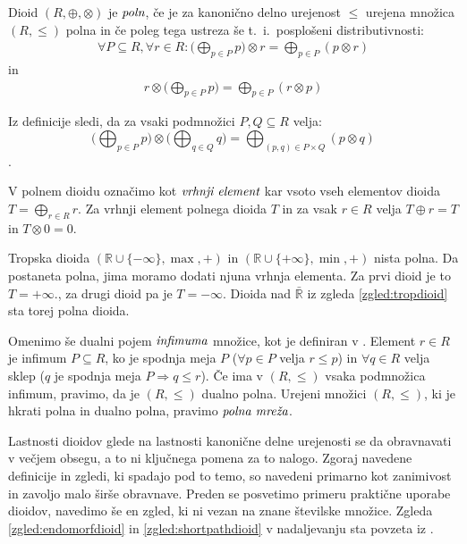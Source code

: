 \documentclass[mat1]{fmfdelo}
\newcommand{\R}{\mathbb{R}}
\newcommand{\pojem}[1]{\ensuremath{\emph{#1}}}
\begin{document}
\begin{definicija}
	Dioid $(R, \oplus,\otimes)$ je \pojem{poln}, če je za kanonično delno urejenost $\leq$ urejena množica $(R, \leq)$ polna in če poleg tega ustreza še t.~i.~posplošeni distributivnosti: \begin{align*}
		\forall P \subseteq R, \forall r \in R: \big(\bigoplus_{p\in P}p\big) \otimes r = \bigoplus_{p\in P} \left(p \otimes r\right)
	\end{align*}
in
\begin{align*}
	r \otimes \big( \bigoplus_{p\in P} p \big) = \bigoplus_{p \in P} \left( r \otimes p \right)
\end{align*}
\end{definicija}

Iz definicije sledi, da za vsaki podmnožici $P, Q \subseteq R$ velja: $$\big( \bigoplus_{p\in P} p \big) \otimes \big( \bigoplus_{q\in Q} q \big) = \bigoplus_{(p, q) \in P\times Q} (p \otimes q)$$.

V polnem dioidu označimo kot \pojem{vrhnji element} kar vsoto vseh elementov dioida $T = \bigoplus_{r \in R} r$. Za vrhnji element polnega dioida $T$ in za vsak $r\in R$ velja $T \oplus r = T$ in $T \otimes 0 = 0$.

\begin{zgled}
	Tropska dioida $(\R\cup \{-\infty\}, \max, +)$ in $(\R\cup \{+\infty\}, \min, +)$ nista polna. Da postaneta polna, jima moramo dodati njuna vrhnja elementa. Za prvi dioid je to $T = +\infty$., za drugi dioid pa je $T = -\infty$. Dioida nad $\bar{\R}$ iz zgleda \ref{zgled:tropdioid} sta torej polna dioida.
\end{zgled}

\begin{opomba}
	Omenimo še dualni pojem \pojem{infimuma} množice, kot je definiran v \cite[str. 10]{bib:Gondran}.
	Element $r\in R$ je infimum $P\subseteq R$, ko je spodnja meja $P$ ($\forall p \in P$ velja $ r \leq p$) in $\forall q \in R$ velja sklep ($q$ je spodnja meja $P \Rightarrow q \leq r$). Če ima v $(R, \leq)$ vsaka podmnožica infimum, pravimo, da je $(R, \leq)$ dualno polna. Urejeni množici $(R, \leq)$, ki je hkrati polna in dualno polna, pravimo \pojem{polna mreža}.
\end{opomba}

Lastnosti dioidov glede na lastnosti kanonične delne urejenosti se da obravnavati v večjem obsegu, a to ni ključnega pomena za to nalogo. Zgoraj navedene definicije in zgledi, ki spadajo pod to temo, so navedeni primarno kot zanimivost in zavoljo malo širše obravnave. Preden se posvetimo primeru praktične uporabe dioidov, navedimo še en zgled, ki ni vezan na znane številske množice. Zgleda \ref{zgled:endomorfdioid} in \ref{zgled:shortpathdioid} v nadaljevanju sta povzeta iz \cite[poglavje 6.\,2.\,]{bib:Gondran}.
\end{document}
